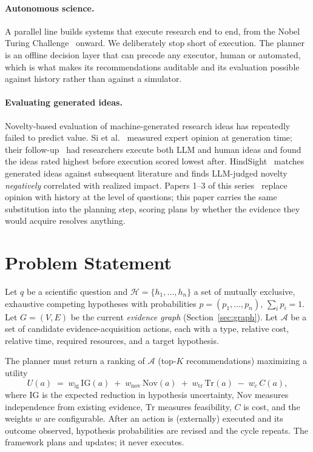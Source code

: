 \documentclass[11pt]{article}
\newcommand{\IG}{\mathrm{IG}}
\begin{document}
\paragraph{Autonomous science.} A parallel line builds systems that
execute research end to end, from the Nobel Turing
Challenge~\cite{kitano2021} onward. We deliberately stop short of
execution. The planner is an offline decision layer that can precede
any executor, human or automated, which is what makes its
recommendations auditable and its evaluation possible against history
rather than against a simulator.

\paragraph{Evaluating generated ideas.} Novelty-based evaluation of
machine-generated research ideas has repeatedly failed to predict value.
Si et al.~\cite{si2024novel} measured expert opinion at generation
time; their follow-up~\cite{si2025execution} had researchers execute
both LLM and human ideas and found the ideas rated highest before
execution scored lowest after. HindSight~\cite{hindsight} matches
generated ideas against subsequent literature and finds LLM-judged
novelty \emph{negatively} correlated with realized impact. Papers 1--3
of this series~\cite{paper1,paper2,paper3} replace opinion with
history at the level of questions; this paper carries the same
substitution into the planning step, scoring plans by whether the
evidence they would acquire resolves anything.

\section{Problem Statement}

Let $q$ be a scientific question and
$\mathcal{H} = \{h_1, \dots, h_n\}$ a set of mutually exclusive,
exhaustive competing hypotheses with probabilities
$p = (p_1, \dots, p_n)$, $\sum_i p_i = 1$. Let $G = (V, E)$ be the
current \emph{evidence graph} (Section~\ref{sec:graph}). Let
$\mathcal{A}$ be a set of candidate evidence-acquisition actions, each
with a type, relative cost, relative time, required resources, and a
target hypothesis.

The planner must return a ranking of $\mathcal{A}$ (top-$K$
recommendations) maximizing a utility
\begin{equation}
U(a) \;=\; w_{\mathrm{ig}}\,\IG(a) \;+\; w_{\mathrm{nov}}\,\mathrm{Nov}(a)
\;+\; w_{\mathrm{tr}}\,\mathrm{Tr}(a) \;-\; w_{c}\,C(a),
\label{eq:utility}
\end{equation}
where $\IG$ is the expected reduction in hypothesis uncertainty,
$\mathrm{Nov}$ measures independence from existing evidence,
$\mathrm{Tr}$ measures feasibility, $C$ is cost, and the weights $w$ are
configurable. After an action is (externally) executed and its outcome
observed, hypothesis probabilities are revised and the cycle repeats. The
framework plans and updates; it never executes.
\end{document}
